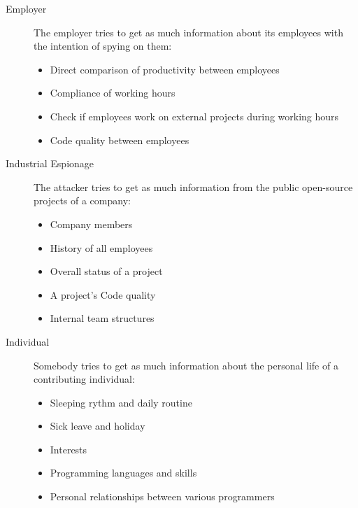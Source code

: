 \begin{description}
    \item[Employer]
        The employer tries to get as much information about its employees with the intention of spying on them:
        \begin{itemize}
            \item Direct comparison of productivity between employees
            \item Compliance of working hours
            \item Check if employees work on external projects during working hours
            \item Code quality between employees
        \end{itemize}

    \item[Industrial Espionage]
        The attacker tries to get as much information from the public open-source projects of a company:
        \begin{itemize}
            \item Company members
            \item History of all employees
            \item Overall status of a project
            \item A project's Code quality
            \item Internal team structures
        \end{itemize}

    \item[Individual]
        Somebody tries to get as much information about the personal life of a contributing individual:
        \begin{itemize}
            \item Sleeping rythm and daily routine
            \item Sick leave and holiday
            \item Interests
            \item Programming languages and skills
            \item Personal relationships between various programmers
        \end{itemize}

\end{description}

